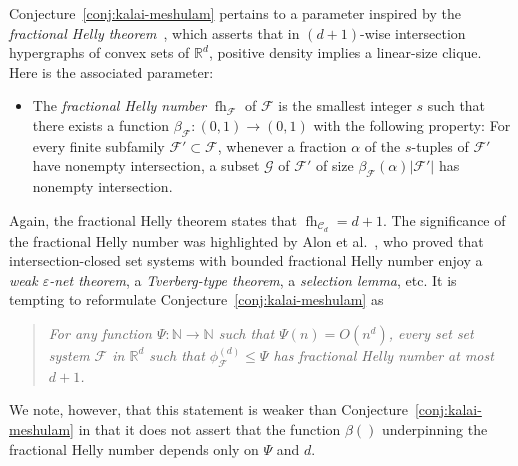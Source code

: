 \documentclass[11pt]{article}
\newcommand{\R}{\mathbb{R}}
\newcommand{\N}{\mathbb{N}}
\newcommand{\C}{\mathcal{C}}
\newcommand{\F}{\mathcal{F}}
\newcommand{\G}{\mathcal{G}}
\DeclareMathOperator{\fh}{fh}
\newcommand{\defn}[1]{\emph{\color{violet}#1}}
\begin{document}
%
\medskip
%
Conjecture~\ref{conj:kalai-meshulam} pertains to a parameter inspired by the \emph{fractional Helly theorem}~\cite{katchalski1979problem,kalai1984intersection}, which asserts that in $(d+1)$-wise intersection hypergraphs of convex sets of $\R^d$, positive density implies a linear-size clique. Here is the associated parameter:
%
\begin{itemize}
\item The \defn{fractional Helly number} $\fh_\F$ of $\F$ is the smallest integer $s$ such that there exists a function $\beta_\F:(0,1)\rightarrow (0,1)$ with the following property: For every finite subfamily $\F'\subset \F$, whenever a fraction $\alpha$ of the $s$-tuples of $\F'$ have nonempty intersection, a subset $\G$ of $\F'$ of size $\beta_\F(\alpha)|\F'|$ has nonempty intersection.
\end{itemize}
%
\noindent
Again, the fractional Helly theorem states that $\fh_{\C_ d} = d+1$. The significance of the fractional Helly number was highlighted by Alon et al.~\cite{transversal-hypergraph}, who proved that intersection-closed set systems with bounded fractional Helly number enjoy a \emph{weak $\varepsilon$-net theorem}, a \emph{Tverberg-type theorem}, a \emph{selection lemma}, etc. It is tempting to reformulate Conjecture~\ref{conj:kalai-meshulam} as
%
\begin{quote}
  \emph{For any function $\Psi: \N \to \N$ such that $\Psi(n) = O(n^d)$, every set set system $\F$ in $\R^d$ such that $\phi_{\F}^{(d)} \le \Psi$ has fractional Helly number at most $d+1$.}
\end{quote}
%
\noindent We note, however, that this statement is weaker than Conjecture~\ref{conj:kalai-meshulam} in that it does not assert that the function $\beta()$ underpinning the fractional Helly number depends only on $\Psi$ and $d$.
%
%
\end{document}
